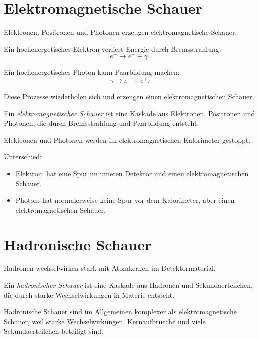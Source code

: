 \section{Elektromagnetische Schauer}

Elektronen, Positronen und Photonen erzeugen elektromagnetische Schauer.

\begin{conceptbox}
Ein hochenergetisches Elektron verliert Energie durch Bremsstrahlung:
\[
    e^- \rightarrow e^- + \gamma.
\]

Ein hochenergetisches Photon kann Paarbildung machen:
\[
    \gamma \rightarrow e^- + e^+.
\]

Diese Prozesse wiederholen sich und erzeugen einen elektromagnetischen Schauer.
\end{conceptbox}

\begin{definitionbox}
Ein \emph{elektromagnetischer Schauer} ist eine Kaskade aus Elektronen, Positronen
und Photonen, die durch Bremsstrahlung und Paarbildung entsteht.
\end{definitionbox}

\begin{examtipbox}
Elektronen und Photonen werden im elektromagnetischen Kalorimeter gestoppt.

Unterschied:
\begin{itemize}
    \item Elektron: hat eine Spur im inneren Detektor und einen elektromagnetischen Schauer.
    \item Photon: hat normalerweise keine Spur vor dem Kalorimeter, aber einen elektromagnetischen Schauer.
\end{itemize}
\end{examtipbox}

\section{Hadronische Schauer}

Hadronen wechselwirken stark mit Atomkernen im Detektormaterial.

\begin{definitionbox}
Ein \emph{hadronischer Schauer} ist eine Kaskade aus Hadronen und Sekundaerteilchen,
die durch starke Wechselwirkungen in Materie entsteht.
\end{definitionbox}

\begin{conceptbox}
Hadronische Schauer sind im Allgemeinen komplexer als elektromagnetische Schauer,
weil starke Wechselwirkungen, Kernaufbrueche und viele Sekundaerteilchen beteiligt sind.
\end{conceptbox}

